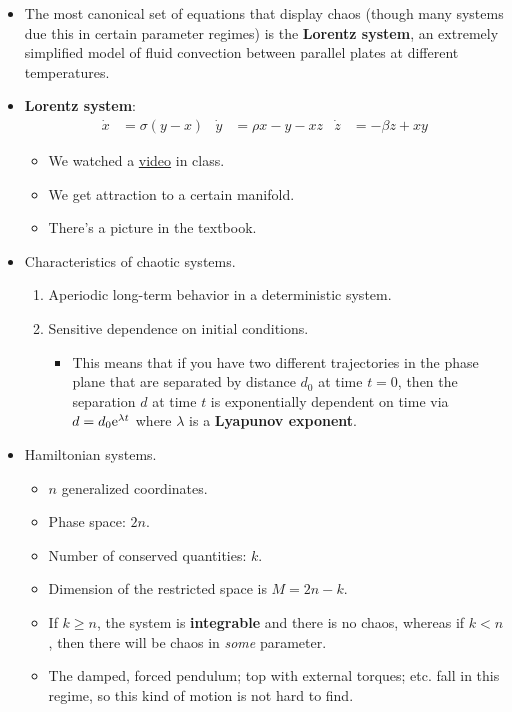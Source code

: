 \documentclass[../notes.tex]{subfiles}
\begin{document}
\begin{itemize}
\begin{enumerate}
    \end{enumerate}
    \item The most canonical set of equations that display chaos (though many systems due this in certain parameter regimes) is the \textbf{Lorentz system}, an extremely simplified model of fluid convection between parallel plates at different temperatures.
    \item \textbf{Lorentz system}:
    \begin{align*}
        \dot{x} &= \sigma(y-x)&
        \dot{y} &= \rho x-y-xz&
        \dot{z} &= -\beta z+xy
    \end{align*}
    \begin{itemize}
        \item We watched a \href{https://youtu.be/q3kNHomvU0k?t=26}{video} in class.
        \item We get attraction to a certain manifold.
        \item There's a picture in the textbook.
    \end{itemize}
    \item Characteristics of chaotic systems.
    \begin{enumerate}
        \item Aperiodic long-term behavior in a deterministic system.
        \item Sensitive dependence on initial conditions.
        \begin{itemize}
            \item This means that if you have two different trajectories in the phase plane that are separated by distance $d_0$ at time $t=0$, then the separation $d$ at time $t$ is exponentially dependent on time via $d=d_0\e[\lambda t]$ where $\lambda$ is a \textbf{Lyapunov exponent}.
        \end{itemize}
    \end{enumerate}
    \item Hamiltonian systems.
    \begin{itemize}
        \item $n$ generalized coordinates.
        \item Phase space: $2n$.
        \item Number of conserved quantities: $k$.
        \item Dimension of the restricted space is $M=2n-k$.
        \item If $k\geq n$, the system is \textbf{integrable} and there is no chaos, whereas if $k<n$, then there will be chaos in \emph{some} parameter.
        \item The damped, forced pendulum; top with external torques; etc. fall in this regime, so this kind of motion is not hard to find.
    \end{itemize}
\end{itemize}
\end{document}
